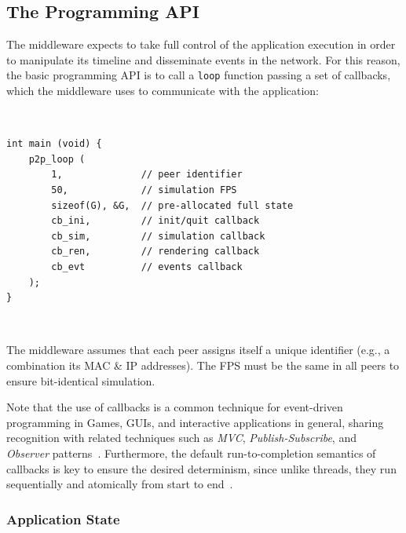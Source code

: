\documentclass[sn-mathphys,iicol]{sn-jnl}%
\newcommand{\code}[1]  {\texttt{\small{#1}}}
\begin{document}
\subsection{The Programming API}
\label{sec.tml.api}

The middleware expects to take full control of the application execution in
order to manipulate its timeline and disseminate events in the network.
For this reason, the basic programming API is to call a \code{loop} function
passing a set of callbacks, which the middleware uses to communicate with the
application:

{\footnotesize
~
\begin{verbatim}
int main (void) {
    p2p_loop (
        1,              // peer identifier
        50,             // simulation FPS
        sizeof(G), &G,  // pre-allocated full state
        cb_ini,         // init/quit callback
        cb_sim,         // simulation callback
        cb_ren,         // rendering callback
        cb_evt          // events callback
    );
}
\end{verbatim}
~
}

The middleware assumes that each peer assigns itself a unique identifier (e.g.,
a combination its MAC \& IP addresses).
The FPS must be the same in all peers to ensure bit-identical simulation.

Note that the use of callbacks is a common technique for event-driven
programming in Games, GUIs, and interactive applications in general, sharing
recognition with related techniques such as \emph{MVC},
\emph{Publish-Subscribe}, and \emph{Observer} patterns~\cite{meyer,nystrom}.
%
Furthermore, the default run-to-completion semantics of callbacks is key to
ensure the desired determinism, since unlike threads, they run sequentially and
atomically from start to end~\cite{events,threads}.


\subsubsection{Application State}
\label{sec.tml.api.state}
\end{document}
